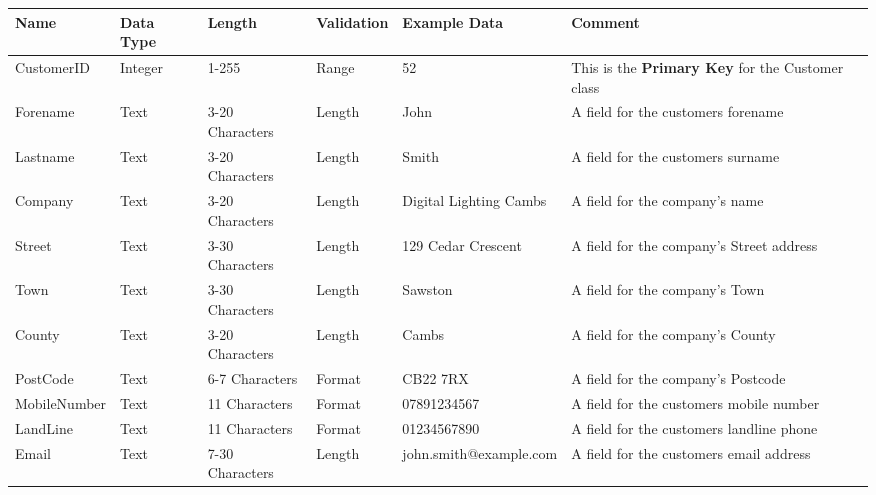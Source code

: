 \begin{landscape}
    \begin{center}
        \begin{tabular}{|p{2.3cm}|p{2cm}|p{3cm}|p{2cm}|p{4.6cm}|p{4cm}|}
            \hline
            \textbf{Name} & \textbf{Data Type} & \textbf{Length} & \textbf{Validation} & \textbf{Example Data} & \textbf{Comment} \\ \hline
            CustomerID   & Integer & 1-255           & Range  & 52                     & This is the \textbf{Primary Key} for the Customer class \\ \hline
            Forename     & Text    & 3-20 Characters & Length & John                   & A field for the customers forename \\ \hline
            Lastname     & Text    & 3-20 Characters & Length & Smith                  & A field for the customers surname\\ \hline
            Company      & Text    & 3-20 Characters & Length & Digital Lighting Cambs & A field for the company's name\\ \hline
            Street       & Text    & 3-30 Characters & Length & 129 Cedar Crescent     & A field for the company's Street address\\ \hline
            Town         & Text    & 3-30 Characters & Length & Sawston                & A field for the company's Town \\ \hline
            County       & Text    & 3-20 Characters & Length & Cambs                  & A field for the company's County \\ \hline
            PostCode     & Text    & 6-7 Characters  & Format & CB22 7RX               & A field for the company's Postcode \\ \hline
            MobileNumber & Text    & 11 Characters   & Format & 07891234567            & A field for the customers mobile number\\ \hline
            LandLine     & Text    & 11 Characters   & Format & 01234567890            & A field for the customers landline phone \\ \hline
            Email        & Text    & 7-30 Characters & Length & john.smith@example.com & A field for the customers email address\\ \hline
        \end{tabular}
    \end{center}
\end{landscape}


